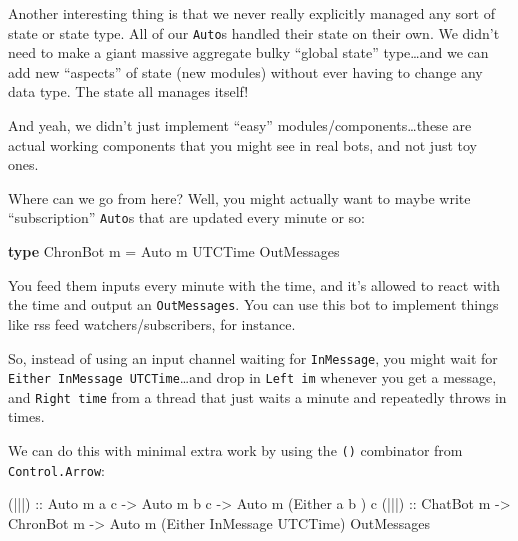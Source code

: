 \documentclass[]{article}
\newenvironment{Shaded}{}{}
\newcommand{\KeywordTok}[1]{\textcolor[rgb]{0.00,0.44,0.13}{\textbf{{#1}}}}
\newcommand{\DataTypeTok}[1]{\textcolor[rgb]{0.56,0.13,0.00}{{#1}}}
\newcommand{\OtherTok}[1]{\textcolor[rgb]{0.00,0.44,0.13}{{#1}}}
\newcommand{\FunctionTok}[1]{\textcolor[rgb]{0.02,0.16,0.49}{{#1}}}
\newcommand{\NormalTok}[1]{{#1}}
\begin{document}
Another interesting thing is that we never really explicitly managed any
sort of state or state type. All of our \texttt{Auto}s handled their
state on their own. We didn't need to make a giant massive aggregate
bulky ``global state'' type\ldots{}and we can add new ``aspects'' of
state (new modules) without ever having to change any data type. The
state all manages itself!

And yeah, we didn't just implement ``easy''
modules/components\ldots{}these are actual working components that you
might see in real bots, and not just toy ones.

Where can we go from here? Well, you might actually want to maybe write
``subscription'' \texttt{Auto}s that are updated every minute or so:

\begin{Shaded}
\begin{Highlighting}[]
\KeywordTok{type} \DataTypeTok{ChronBot} \NormalTok{m }\FunctionTok{=} \DataTypeTok{Auto} \NormalTok{m }\DataTypeTok{UTCTime} \DataTypeTok{OutMessages}
\end{Highlighting}
\end{Shaded}

You feed them inputs every minute with the time, and it's allowed to
react with the time and output an \texttt{OutMessages}. You can use this
bot to implement things like rss feed watchers/subscribers, for
instance.

So, instead of using an input channel waiting for \texttt{InMessage},
you might wait for \texttt{Either\ InMessage\ UTCTime}\ldots{}and drop
in \texttt{Left\ im} whenever you get a message, and
\texttt{Right\ time} from a thread that just waits a minute and
repeatedly throws in times.

We can do this with minimal extra work by using the
\texttt{(\textbar{}\textbar{}\textbar{})} combinator from
\texttt{Control.Arrow}:

\begin{Shaded}
\begin{Highlighting}[]
\OtherTok{(|||) ::} \DataTypeTok{Auto} \NormalTok{m a c }\OtherTok{->} \DataTypeTok{Auto} \NormalTok{m b c }\OtherTok{->} \DataTypeTok{Auto} \NormalTok{m (}\DataTypeTok{Either} \NormalTok{a         b      ) c}
\OtherTok{(|||) ::} \DataTypeTok{ChatBot} \NormalTok{m  }\OtherTok{->} \DataTypeTok{ChronBot} \NormalTok{m }\OtherTok{->} \DataTypeTok{Auto} \NormalTok{m (}\DataTypeTok{Either} \DataTypeTok{InMessage} \DataTypeTok{UTCTime}\NormalTok{) }\DataTypeTok{OutMessages}
\end{Highlighting}
\end{Shaded}
\end{document}

